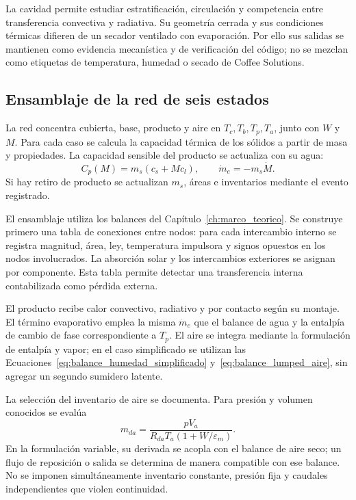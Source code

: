 La cavidad permite estudiar estratificación, circulación y competencia entre transferencia convectiva y radiativa. Su geometría cerrada y sus condiciones térmicas difieren de un secador ventilado con evaporación. Por ello sus salidas se mantienen como evidencia mecanística y de verificación del código; no se mezclan como etiquetas de temperatura, humedad o secado de Coffee Solutions.

\subsection{Ensamblaje de la red de seis estados}
\label{met:red}

La red concentra cubierta, base, producto y aire en $T_c,T_b,T_p,T_a$, junto con $W$ y $M$. Para cada caso se calcula la capacidad térmica de los sólidos a partir de masa y propiedades. La capacidad sensible del producto se actualiza con su agua:
\begin{equation}
C_p(M)=m_s(c_s+Mc_l),\qquad
\dot m_e=-m_s\dot M.
\label{met:capacidad_producto}
\end{equation}
Si hay retiro de producto se actualizan $m_s$, áreas e inventarios mediante el evento registrado.

El ensamblaje utiliza los balances del Capítulo~\ref{ch:marco_teorico}. Se construye primero una tabla de conexiones entre nodos: para cada intercambio interno se registra magnitud, área, ley, temperatura impulsora y signos opuestos en los nodos involucrados. La absorción solar y los intercambios exteriores se asignan por componente. Esta tabla permite detectar una transferencia interna contabilizada como pérdida externa.

El producto recibe calor convectivo, radiativo y por contacto según su montaje. El término evaporativo emplea la misma $\dot m_e$ que el balance de agua y la entalpía de cambio de fase correspondiente a $T_p$. El aire se integra mediante la formulación de entalpía y vapor; en el caso simplificado se utilizan las Ecuaciones~\ref{eq:balance_humedad_simplificado} y~\ref{eq:balance_lumped_aire}, sin agregar un segundo sumidero latente.

La selección del inventario de aire se documenta. Para presión y volumen conocidos se evalúa
\begin{equation}
m_{da}=\frac{pV_a}
{R_{da}T_a(1+W/\varepsilon_m)}.
\label{met:inventario_aire}
\end{equation}
En la formulación variable, su derivada se acopla con el balance de aire seco; un flujo de reposición o salida se determina de manera compatible con ese balance. No se imponen simultáneamente inventario constante, presión fija y caudales independientes que violen continuidad.

